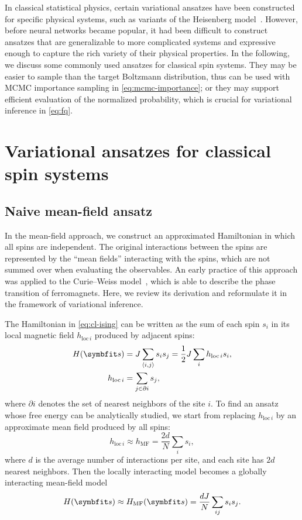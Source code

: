 In classical statistical physics, certain variational ansatzes have been constructed for specific physical systems, such as variants of the Heisenberg model~\cite{tsallis1976classical, castro2007free, carvalho2012variational}. However, before neural networks became popular, it had been difficult to construct ansatzes that are generalizable to more complicated systems and expressive enough to capture the rich variety of their physical properties. In the following, we discuss some commonly used ansatzes for classical spin systems. They may be easier to sample than the target Boltzmann distribution, thus can be used with MCMC importance sampling in \cref{eq:mcmc-importance}; or they may support efficient evaluation of the normalized probability, which is crucial for variational inference in \cref{eq:fq}.

\section{Variational ansatzes for classical spin systems}

\subsection{Naive mean-field ansatz}
\label{sec:nmf}

In the mean-field approach, we construct an approximated Hamiltonian in which all spins are independent. The original interactions between the spins are represented by the ``mean fields'' interacting with the spins, which are not summed over when evaluating the observables. An early practice of this approach was applied to the Curie--Weiss model~\cite{weiss1907hypothese}, which is able to describe the phase transition of ferromagnets. Here, we review its derivation and reformulate it in the framework of variational inference.

The Hamiltonian in \cref{eq:cl-ising} can be written as the sum of each spin $s_i$ in its local magnetic field $h_{\text{loc}\,i}$ produced by adjacent spins:
\begin{align}
H(\vs) &= J \sum_{\langle i, j \rangle} s_i s_j
= \frac{1}{2} J \sum_i h_{\text{loc}\,i} s_i, \\
h_{\text{loc}\,i} &= \sum_{j \in \partial i} s_j,
\end{align}
where $\partial i$ denotes the set of nearest neighbors of the site $i$. To find an ansatz whose free energy can be analytically studied, we start from replacing $h_{\text{loc}\,i}$ by an approximate mean field produced by all spins:
\begin{equation}
h_{\text{loc}\,i} \approx h_\text{MF} = \frac{2 d}{N} \sum_i s_i,
\end{equation}
where $d$ is the average number of interactions per site, and each site has $2 d$ nearest neighbors. Then the locally interacting model becomes a globally interacting mean-field model
\begin{equation}
H(\vs) \approx H_\text{MF}(\vs) = \frac{d J}{N} \sum_{i j} s_i s_j.
\label{eq:ham-mf}
\end{equation}

